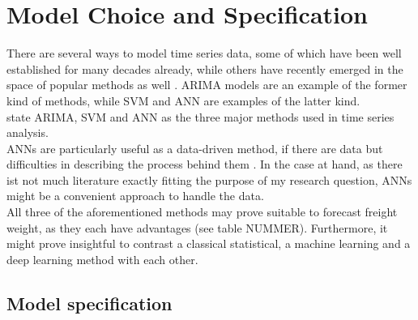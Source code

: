 \documentclass[a4paper, 11pt]{article}
\begin{document}
\section{Model Choice and Specification}

There are several ways to model time series data, some of which have been well established for many decades already, while others have recently emerged in the space of popular methods as well . ARIMA models are an example of the former kind of methods, while SVM and ANN are examples of the latter kind. \citep{Adhikari.2015}\\
\cite{JoaoF.L.Oliveira.2014} state ARIMA, SVM and ANN as the three major methods used in time series analysis. \\

ANNs are particularly useful as a data-driven method, if there are data but difficulties in describing the process behind them \citep{Zhang.1998}. In the case at hand, as there ist not much literature exactly fitting the purpose of my research question, ANNs might be a convenient approach to handle the data.\\

All three of the aforementioned methods may prove suitable to forecast freight weight, as they each have advantages (see table NUMMER). Furthermore, it might prove insightful to contrast a classical statistical, a machine learning and a deep learning method with each other.


\subsection{Model specification}
\end{document}

